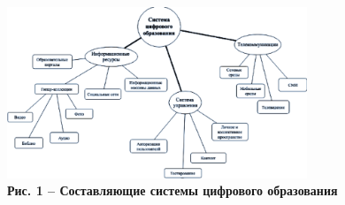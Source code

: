 \begin{figure}[H]
	\centering
	\includegraphics[width=0.8\textwidth]{assets/205.1}
	\caption*{\bfseries Рис. 1 -- Составляющие системы цифрового образования}
\end{figure}


